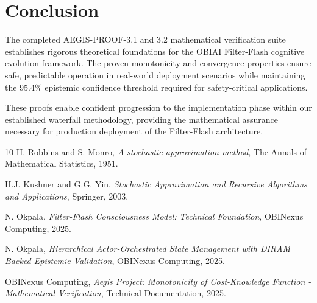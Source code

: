\documentclass[11pt]{article}
\theoremstyle{definition}
\begin{document}
\section{Conclusion}

The completed AEGIS-PROOF-3.1 and 3.2 mathematical verification suite establishes rigorous theoretical foundations for the OBIAI Filter-Flash cognitive evolution framework. The proven monotonicity and convergence properties ensure safe, predictable operation in real-world deployment scenarios while maintaining the 95.4\% epistemic confidence threshold required for safety-critical applications.

These proofs enable confident progression to the implementation phase within our established waterfall methodology, providing the mathematical assurance necessary for production deployment of the Filter-Flash architecture.

\begin{thebibliography}{10}
 H. Robbins and S. Monro, \textit{A stochastic approximation method}, The Annals of Mathematical Statistics, 1951.

 H.J. Kushner and G.G. Yin, \textit{Stochastic Approximation and Recursive Algorithms and Applications}, Springer, 2003.

 N. Okpala, \textit{Filter-Flash Consciousness Model: Technical Foundation}, OBINexus Computing, 2025.

 N. Okpala, \textit{Hierarchical Actor-Orchestrated State Management with DIRAM Backed Epistemic Validation}, OBINexus Computing, 2025.

 OBINexus Computing, \textit{Aegis Project: Monotonicity of Cost-Knowledge Function - Mathematical Verification}, Technical Documentation, 2025.
\end{thebibliography}
\end{document}
